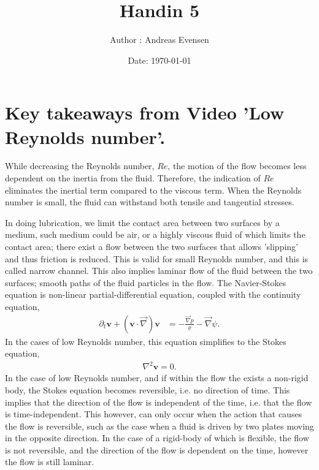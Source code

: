 \documentclass{article}
\title{Handin 5}
\author{Author : Andreas Evensen}
\date{Date: \today}
\begin{document}
\maketitle

\section*{Key takeaways from Video 'Low Reynolds number'.}
While decreasing the Reynolds number, $Re$, the motion of the flow becomes less dependent on the inertia from the fluid.
Therefore, the indication of $Re$ eliminates the inertial term compared to the viscous term. When the Reynolds number is small, the fluid can withstand both tensile and tangential stresses.

\vspace{0.7cm}\noindent
In doing lubrication, we limit the contact area between two surfaces by a medium, such medium could be air, or a highly viscous fluid of which limits the contact area;
there exist a flow between the two surfaces that allows 'slipping' and thus friction is reduced. This is valid for small Reynolds number, and this is called narrow channel. 
This also implies laminar flow of the fluid between the two surfaces; smooth paths of the fluid particles in the flow.
The Navier-Stokes equation is non-linear partial-differential equation, coupled with the continuity equation,
\begin{align}
    \partial_t\mathbf{v} + \left(\mathbf{v}\cdot\vec{\nabla}\right)\mathbf{v} &= - \frac{\vec{\nabla}p }{\varrho} - \vec{\nabla}\psi.\label{eq: Navier-Stokes}
\end{align}In the cases of low Reynolds number, this equation simplifies to the Stokes equation,
\begin{align}
    \nabla^2\mathbf{v} = 0.\label{eq: Stokes}
\end{align}
In the case of low Reynolds number, and if within the flow the exists a non-rigid body, the Stokes equation becomes reversible, i.e. no direction of time.
This implies that the direction of the flow is independent of the time, i.e. that the flow is time-independent.
This however, can only occur when the action that causes the flow is reversible, such as the case when a fluid is driven by two plates moving in the opposite direction. 
In the case of a rigid-body of which is flexible, the flow is not reversible, and the direction of the flow is dependent on the time, however the flow is still laminar.
\end{document}
